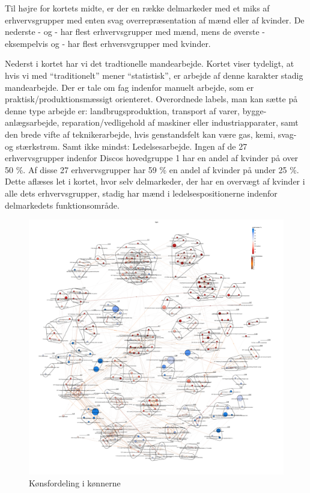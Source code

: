 Til højre for kortets midte, er der en række delmarkeder med et miks af erhvervsgrupper med enten svag overrepræsentation af mænd eller af kvinder. De nederste -  og  - har flest erhvervsgrupper med mænd, mens de øverste - eksempelvis  og  - har flest erhversvgrupper med kvinder. 

Nederst i kortet har vi det tradtionelle mandearbejde. Kortet viser tydeligt, at hvis vi med “traditionelt” mener “statistisk”, er arbejde af denne karakter stadig mandearbejde. Der er tale om fag indenfor manuelt arbejde, som er praktisk/produktionsmæssigt orienteret. Overordnede labels, man kan sætte på denne type arbejde er: landbrugsproduktion, transport af varer, bygge-anlægsarbejde, reparation/vedligehold af maskiner eller industriapparater, samt den brede vifte af teknikerarbejde, hvis genstandsfelt kan være gas, kemi, svag- og stærkstrøm. Samt ikke mindst: Ledelsesarbejde. Ingen af de 27 erhvervsgrupper indenfor Discos hovedgruppe 1 har en andel af kvinder på over 50 \%. Af disse 27 erhvervsgrupper har 59 \% en andel af kvinder på under 25 \%. Dette aflæses let i kortet, hvor selv delmarkeder, der har en overvægt af kvinder i alle dets erhvervsgrupper, stadig har mænd i ledelsespositionerne indenfor delmarkedets funktionsområde.  %


%
\begin{figure}[H]
\begin{center}
  \caption{Kønsfordeling i kønnerne}
  \label{fig_delanalyse1_kort_koen}
  \includegraphics[width=1.0\textwidth]{fig/netvaerkskort/kort_koen.pdf}
\end{center}
\end{figure}
\restoregeometry
%



